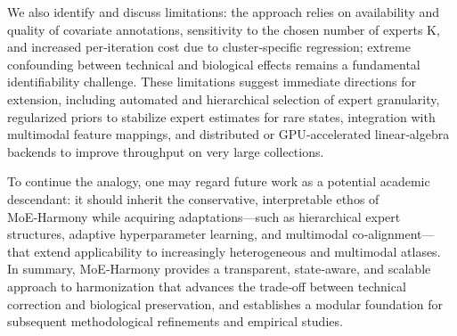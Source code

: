 \documentclass{article}
\begin{document}
We also identify and discuss limitations: the approach relies on availability and quality of covariate annotations, sensitivity to the chosen number of experts K, and increased per‑iteration cost due to cluster‑specific regression; extreme confounding between technical and biological effects remains a fundamental identifiability challenge. These limitations suggest immediate directions for extension, including automated and hierarchical selection of expert granularity, regularized priors to stabilize expert estimates for rare states, integration with multimodal feature mappings, and distributed or GPU‑accelerated linear‑algebra backends to improve throughput on very large collections.

To continue the analogy, one may regard future work as a potential academic descendant: it should inherit the conservative, interpretable ethos of MoE‑Harmony while acquiring adaptations—such as hierarchical expert structures, adaptive hyperparameter learning, and multimodal co‑alignment—that extend applicability to increasingly heterogeneous and multimodal atlases. In summary, MoE‑Harmony provides a transparent, state‑aware, and scalable approach to harmonization that advances the trade‑off between technical correction and biological preservation, and establishes a modular foundation for subsequent methodological refinements and empirical studies.

\medskip



\end{document}
